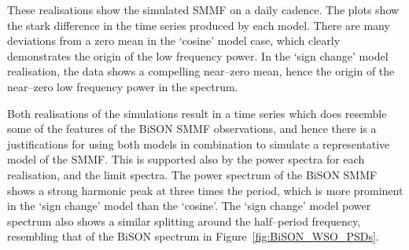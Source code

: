These realisations show the simulated SMMF on a daily cadence. The plots show the stark difference in the time series produced by each model. There are many deviations from a zero mean in the `cosine' model case, which clearly demonstrates the origin of the low frequency power. In the `sign change' model realisation, the data shows a compelling near--zero mean, hence the origin of the near--zero low frequency power in the spectrum.

Both realisations of the simulations result in a time series which does resemble some of the features of the BiSON SMMF observations, and hence there is a justifications for using both models in combination to simulate a representative model of the SMMF. This is supported also by the power spectra for each realisation, and the limit spectra. The power spectrum of the BiSON SMMF shows a strong harmonic peak at three times the period, which is more prominent in the `sign change' model than the `cosine'. The `sign change' model power spectrum also shows a similar splitting around the half--period frequency, resembling that of the BiSON spectrum in Figure~\ref{fig:BiSON_WSO_PSDs}.